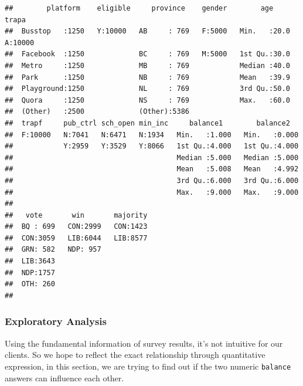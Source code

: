 \documentclass[
]{article}
\newenvironment{Shaded}{\begin{snugshade}}{\end{snugshade}}
\newcommand{\CommentTok}[1]{\textcolor[rgb]{0.56,0.35,0.01}{\textit{#1}}}
\newcommand{\KeywordTok}[1]{\textcolor[rgb]{0.13,0.29,0.53}{\textbf{#1}}}
\newcommand{\NormalTok}[1]{#1}
\newcommand{\OperatorTok}[1]{\textcolor[rgb]{0.81,0.36,0.00}{\textbf{#1}}}
\begin{document}
\begin{verbatim}
##        platform    eligible     province    gender        age       trapa    
##  Busstop   :1250   Y:10000   AB     : 769   F:5000   Min.   :20.0   A:10000  
##  Facebook  :1250             BC     : 769   M:5000   1st Qu.:30.0            
##  Metro     :1250             MB     : 769            Median :40.0            
##  Park      :1250             NB     : 769            Mean   :39.9            
##  Playground:1250             NL     : 769            3rd Qu.:50.0            
##  Quora     :1250             NS     : 769            Max.   :60.0            
##  (Other)   :2500             (Other):5386                                    
##  trapf     pub_ctrl sch_open min_inc     balance1        balance2    
##  F:10000   N:7041   N:6471   N:1934   Min.   :1.000   Min.   :0.000  
##            Y:2959   Y:3529   Y:8066   1st Qu.:4.000   1st Qu.:4.000  
##                                       Median :5.000   Median :5.000  
##                                       Mean   :5.008   Mean   :4.992  
##                                       3rd Qu.:6.000   3rd Qu.:6.000  
##                                       Max.   :9.000   Max.   :9.000  
##                                                                      
##   vote       win       majority  
##  BQ : 699   CON:2999   CON:1423  
##  CON:3059   LIB:6044   LIB:8577  
##  GRN: 582   NDP: 957             
##  LIB:3643                        
##  NDP:1757                        
##  OTH: 260                        
## 
\end{verbatim}

\hypertarget{exploratory-analysis}{%
\subsubsection{Exploratory Analysis}\label{exploratory-analysis}}

Using the fundamental information of survey results, it's not intuitive
for our clients. So we hope to reflect the exact relationship through
quantitative expression, in this section, we are trying to find out if
the two numeric \texttt{balance} answers can influence each other.

\begin{Shaded}
\end{Shaded}
\end{document}
